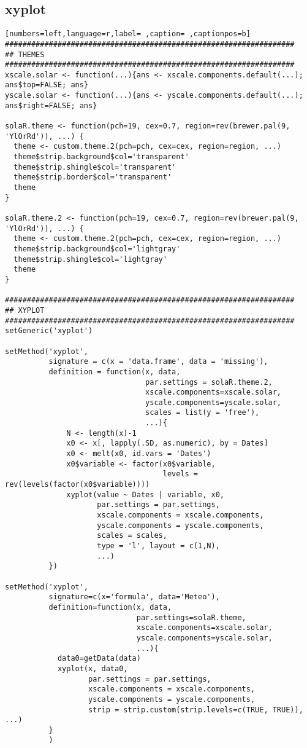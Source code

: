 \subsection{xyplot}
\label{sec:orgc632def}
\begin{lstlisting}[numbers=left,language=r,label= ,caption= ,captionpos=b]
##################################################################
## THEMES
##################################################################
xscale.solar <- function(...){ans <- xscale.components.default(...); ans$top=FALSE; ans}
yscale.solar <- function(...){ans <- yscale.components.default(...); ans$right=FALSE; ans}

solaR.theme <- function(pch=19, cex=0.7, region=rev(brewer.pal(9, 'YlOrRd')), ...) {
  theme <- custom.theme.2(pch=pch, cex=cex, region=region, ...)
  theme$strip.background$col='transparent'
  theme$strip.shingle$col='transparent'
  theme$strip.border$col='transparent'
  theme
}

solaR.theme.2 <- function(pch=19, cex=0.7, region=rev(brewer.pal(9, 'YlOrRd')), ...) {
  theme <- custom.theme.2(pch=pch, cex=cex, region=region, ...)
  theme$strip.background$col='lightgray'
  theme$strip.shingle$col='lightgray'
  theme
}

##################################################################
## XYPLOT
##################################################################
setGeneric('xyplot')

setMethod('xyplot',
          signature = c(x = 'data.frame', data = 'missing'),
          definition = function(x, data,
                                par.settings = solaR.theme.2,
                                xscale.components=xscale.solar,
                                yscale.components=yscale.solar,
                                scales = list(y = 'free'),
                                ...){
              N <- length(x)-1
              x0 <- x[, lapply(.SD, as.numeric), by = Dates]
              x0 <- melt(x0, id.vars = 'Dates')
              x0$variable <- factor(x0$variable,
                                    levels = rev(levels(factor(x0$variable))))
              xyplot(value ~ Dates | variable, x0,
                     par.settings = par.settings,
                     xscale.components = xscale.components,
                     yscale.components = yscale.components,
                     scales = scales,
                     type = 'l', layout = c(1,N),
                     ...)
          })

setMethod('xyplot',
          signature=c(x='formula', data='Meteo'),
          definition=function(x, data,
                              par.settings=solaR.theme,
                              xscale.components=xscale.solar,
                              yscale.components=yscale.solar,
                              ...){
            data0=getData(data)
            xyplot(x, data0,
                   par.settings = par.settings,
                   xscale.components = xscale.components,
                   yscale.components = yscale.components,
                   strip = strip.custom(strip.levels=c(TRUE, TRUE)), ...)
          }
          )


\end{lstlisting}
